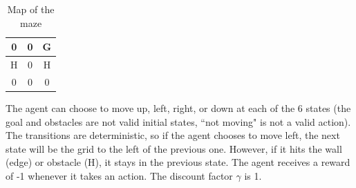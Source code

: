 \documentclass[11pt]{article}
\numberwithin{equation}{section} %
\numberwithin{figure}{section} %
\numberwithin{table}{section} %
\begin{document}
\begin{table}[H]
\begin{center}
  \begin{tabular}{ | c | c | c | }
    \hline
    0 & 0 & G\\ \hline
    H & 0 & H \\ \hline
    0 & 0 & 0 \\ \hline
  \end{tabular}
 \caption{Map of the maze}
\end{center}
\end{table}

The agent can choose to move up, left, right, or down at each of the 6 states (the goal and obstacles are not valid initial states, ``not moving" is not a valid action). The transitions are deterministic, so if the agent chooses to move left, the next state will be the grid to the left of the previous one. However, if it hits the wall (edge) or obstacle (H), it stays in the previous state. The agent receives a reward of -1 whenever it takes an action. The discount factor $\gamma$ is 1.
 
\end{document}
